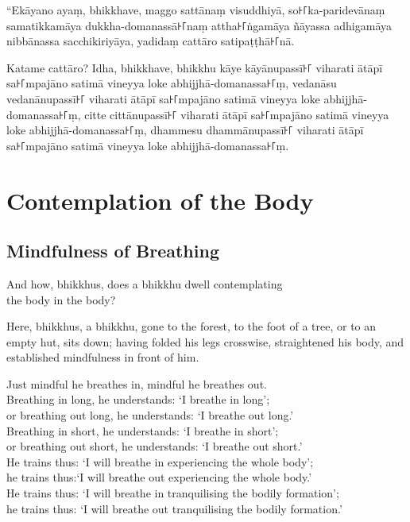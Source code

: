 “Ekāyano ayaṃ, bhikkhave, maggo sattānaṃ visuddhiyā, so꜔꜒ka-paridevānaṃ
samatikkamāya dukkha-domanassā꜔꜒naṃ attha꜔꜒ṅgamāya ñāyassa adhigamāya nibbānassa
sacchikiriyāya, yadidaṃ cattāro satipaṭṭhā꜔꜒nā.

Katame cattāro? Idha, bhikkhave, bhikkhu kāye kāyānupassī꜔꜒ viharati ātāpī
sa꜔꜒mpajāno satimā vineyya loke abhijjhā-domanassa꜔꜒ṃ, vedanāsu vedanānupassī꜔꜒
viharati ātāpī sa꜔꜒mpajāno satimā vineyya loke abhijjhā-domanassa꜔꜒ṃ, citte
cittānupassī꜔꜒ viharati ātāpī sa꜔꜒mpajāno satimā vineyya loke abhijjhā-domanassa꜔꜒ṃ,
dhammesu dhammānupassī꜔꜒ viharati ātāpī sa꜔꜒mpajāno satimā vineyya loke
abhijjhā-domanassa꜔꜒ṃ.


\englishPage
\chapter{Contemplation of the Body}

\section{Mindfulness of Breathing}

And how, bhikkhus, does a bhikkhu dwell contemplating\\
the body in the body?

Here, bhikkhus, a bhikkhu, gone to the forest, to the foot of a tree, or to an
empty hut, sits down; having folded his legs crosswise, straightened his body,
and established mindfulness in front of him.

Just mindful he breathes in, mindful he breathes out.\\
Breathing in long, he understands: ‘I breathe in long’;\\
or breathing out long, he understands: ‘I breathe out long.’\\
Breathing in short, he understands: ‘I breathe in short’;\\
or breathing out short, he understands: ‘I breathe out short.’\\
He trains thus: ‘I will breathe in experiencing the whole body’;\\
he trains thus:‘I will breathe out experiencing the whole body.’\\
He trains thus: ‘I will breathe in tranquilising the bodily formation’;\\
he trains thus: ‘I will breathe out tranquilising the bodily formation.’

